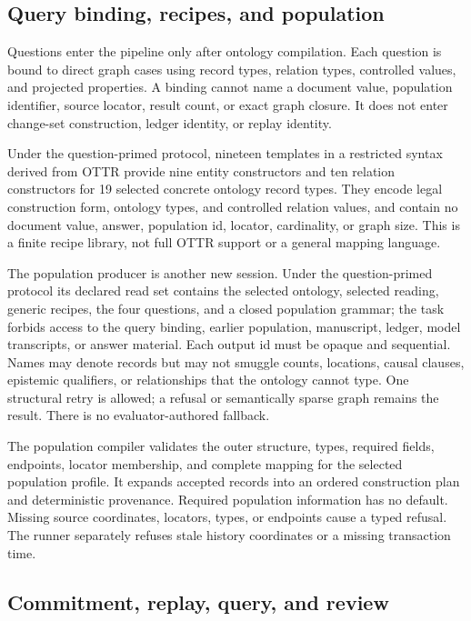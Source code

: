 \documentclass[10pt]{article}
\begin{document}
\subsection{Query binding, recipes, and population}

Questions enter the pipeline only after ontology compilation. Each question is bound to direct graph cases using record types, relation types, controlled values, and projected properties. A binding cannot name a document value, population identifier, source locator, result count, or exact graph closure. It does not enter change-set construction, ledger identity, or replay identity.

Under the question-primed protocol, nineteen templates in a restricted syntax derived from OTTR provide nine entity constructors and ten relation constructors for 19 selected concrete ontology record types. They encode legal construction form, ontology types, and controlled relation values, and contain no document value, answer, population id, locator, cardinality, or graph size. This is a finite recipe library, not full OTTR support or a general mapping language.

The population producer is another new session. Under the question-primed protocol its declared read set contains the selected ontology, selected reading, generic recipes, the four questions, and a closed population grammar; the task forbids access to the query binding, earlier population, manuscript, ledger, model transcripts, or answer material. Each output id must be opaque and sequential. Names may denote records but may not smuggle counts, locations, causal clauses, epistemic qualifiers, or relationships that the ontology cannot type. One structural retry is allowed; a refusal or semantically sparse graph remains the result. There is no evaluator-authored fallback.

The population compiler validates the outer structure, types, required fields, endpoints, locator membership, and complete mapping for the selected population profile. It expands accepted records into an ordered construction plan and deterministic provenance. Required population information has no default. Missing source coordinates, locators, types, or endpoints cause a typed refusal. The runner separately refuses stale history coordinates or a missing transaction time.

\subsection{Commitment, replay, query, and review}
\label{sec:commitment}
\end{document}

